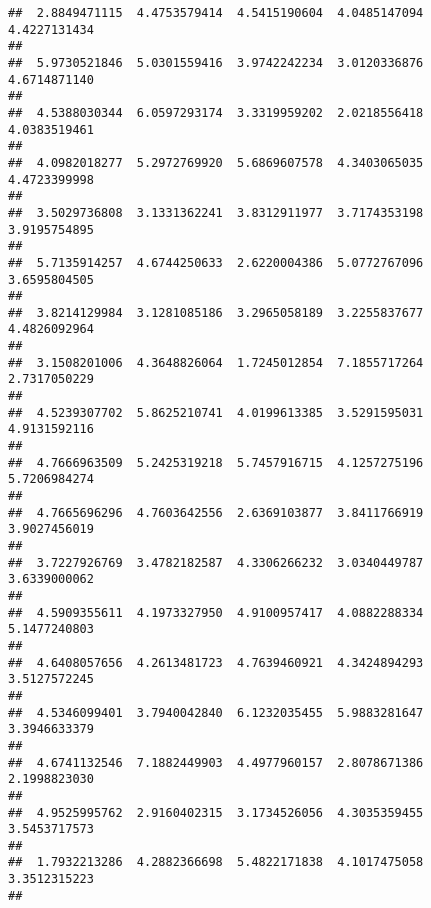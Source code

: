 \documentclass[]{article}
\begin{document}
\begin{verbatim}
##  2.8849471115  4.4753579414  4.5415190604  4.0485147094  4.4227131434 
##                                                                       
##  5.9730521846  5.0301559416  3.9742242234  3.0120336876  4.6714871140 
##                                                                       
##  4.5388030344  6.0597293174  3.3319959202  2.0218556418  4.0383519461 
##                                                                       
##  4.0982018277  5.2972769920  5.6869607578  4.3403065035  4.4723399998 
##                                                                       
##  3.5029736808  3.1331362241  3.8312911977  3.7174353198  3.9195754895 
##                                                                       
##  5.7135914257  4.6744250633  2.6220004386  5.0772767096  3.6595804505 
##                                                                       
##  3.8214129984  3.1281085186  3.2965058189  3.2255837677  4.4826092964 
##                                                                       
##  3.1508201006  4.3648826064  1.7245012854  7.1855717264  2.7317050229 
##                                                                       
##  4.5239307702  5.8625210741  4.0199613385  3.5291595031  4.9131592116 
##                                                                       
##  4.7666963509  5.2425319218  5.7457916715  4.1257275196  5.7206984274 
##                                                                       
##  4.7665696296  4.7603642556  2.6369103877  3.8411766919  3.9027456019 
##                                                                       
##  3.7227926769  3.4782182587  4.3306266232  3.0340449787  3.6339000062 
##                                                                       
##  4.5909355611  4.1973327950  4.9100957417  4.0882288334  5.1477240803 
##                                                                       
##  4.6408057656  4.2613481723  4.7639460921  4.3424894293  3.5127572245 
##                                                                       
##  4.5346099401  3.7940042840  6.1232035455  5.9883281647  3.3946633379 
##                                                                       
##  4.6741132546  7.1882449903  4.4977960157  2.8078671386  2.1998823030 
##                                                                       
##  4.9525995762  2.9160402315  3.1734526056  4.3035359455  3.5453717573 
##                                                                       
##  1.7932213286  4.2882366698  5.4822171838  4.1017475058  3.3512315223 
##                                                                       

\end{verbatim}
\end{document}
